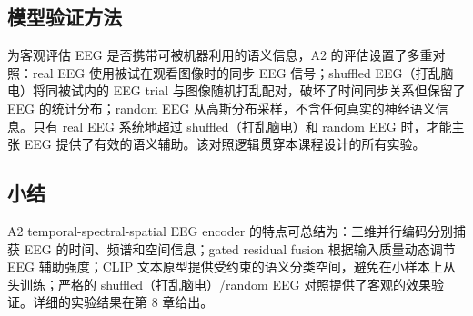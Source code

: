 \subsection{模型验证方法}

为客观评估 EEG 是否携带可被机器利用的语义信息，A2 的评估设置了多重对照：real EEG 使用被试在观看图像时的同步 EEG 信号；shuffled EEG（打乱脑电）将同被试内的 EEG trial 与图像随机打乱配对，破坏了时间同步关系但保留了 EEG 的统计分布；random EEG 从高斯分布采样，不含任何真实的神经语义信息。只有 real EEG 系统地超过 shuffled（打乱脑电）和 random EEG 时，才能主张 EEG 提供了有效的语义辅助。该对照逻辑贯穿本课程设计的所有实验。

\subsection{小结}

A2 temporal-spectral-spatial EEG encoder 的特点可总结为：三维并行编码分别捕获 EEG 的时间、频谱和空间信息；gated residual fusion 根据输入质量动态调节 EEG 辅助强度；CLIP 文本原型提供受约束的语义分类空间，避免在小样本上从头训练；严格的 shuffled（打乱脑电）/random EEG 对照提供了客观的效果验证。详细的实验结果在第 8 章给出。
